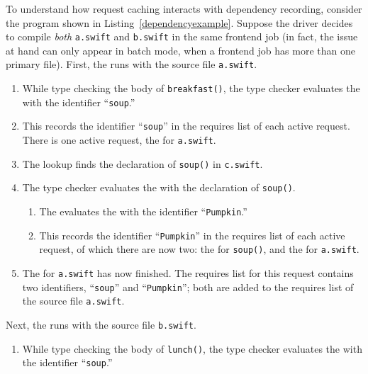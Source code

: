 \documentclass[../generics]{subfiles}
\begin{document}
\begin{example}
To understand how request caching interacts with dependency recording, consider the program shown in Listing~\ref{dependencyexample}. Suppose the driver decides to compile \emph{both} \texttt{a.swift} and \texttt{b.swift} in the same frontend job (in fact, the issue at hand can only appear in batch mode, when a frontend job has more than one primary file). First, the  runs with the source file \texttt{a.swift}.
\begin{enumerate}
\item While type checking the body of \texttt{breakfast()}, the type checker evaluates the  with the identifier ``\texttt{soup}.''
\item This records the identifier ``\texttt{soup}'' in the requires list of each active request. There is one active request, the  for \texttt{a.swift}.
\item The lookup finds the declaration of \texttt{soup()} in \texttt{c.swift}.
\item The type checker evaluates the  with the declaration of \texttt{soup()}.
\begin{enumerate}
\item The  evaluates the  with the identifier ``\texttt{Pumpkin}.''
\item This records the identifier ``\texttt{Pumpkin}'' in the requires list of each active request, of which there are now two: the  for \texttt{soup()}, and the  for \texttt{a.swift}.
\end{enumerate}
\item The  for \texttt{a.swift} has now finished. The requires list for this request contains two identifiers, ``\texttt{soup}'' and ``\texttt{Pumpkin}''; both are added to the requires list of the source file \texttt{a.swift}.
\end{enumerate}
Next, the  runs with the source file \texttt{b.swift}.
\begin{enumerate}
\item While type checking the body of \texttt{lunch()}, the type checker evaluates the  with the identifier ``\texttt{soup}.''

\end{enumerate}
\end{example}
\end{document}
